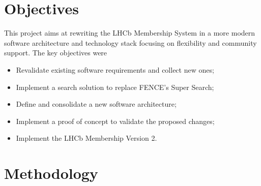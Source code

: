 






\section{Objectives}

This project aims at rewriting the LHCb Membership System in a more modern software architecture and technology stack focusing on flexibility and community support. The key objectives were
\begin{itemize}
    \item Revalidate existing software requirements and collect new ones;
    \item Implement a search solution to replace FENCE's Super Search;
    \item Define and consolidate a new software architecture;
    \item Implement a proof of concept to validate the proposed changes;
    \item Implement the LHCb Membership Version 2.
\end{itemize}



\section{Methodology}


